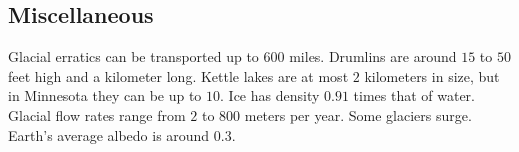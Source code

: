 \documentclass[11pt]{scrartcl}
\begin{document}
\subsection{Miscellaneous}

\begin{itemize}
	\ii Glacial erratics can be transported up to $600$ miles.
	\ii Drumlins are around $15$ to $50$ feet high and a kilometer long.
	\ii Kettle lakes are at most $2$ kilometers in size, but in Minnesota they can be up to $10$.
	\ii Ice has density $0.91$ times that of water.
	\ii Glacial flow rates range from $2$ to $800$ meters per year. Some glaciers surge.
	\ii Earth's average albedo is around $0.3$.
\end{itemize}

\end{document}
